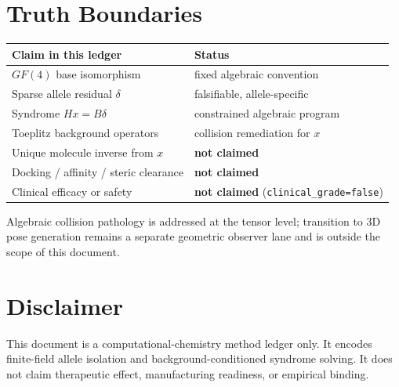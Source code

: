 \documentclass[11pt]{article}
\begin{document}
\section{Truth Boundaries}
\begin{center}
\begin{tabular}{@{}lp{}@{}}
\toprule
Claim in this ledger & Status\\
\midrule
\(GF(4)\) base isomorphism & fixed algebraic convention\\
Sparse allele residual \(\delta\) & falsifiable, allele-specific\\
Syndrome \(Hx=B\delta\) & constrained algebraic program\\
Toeplitz background operators & collision remediation for \(x\)\\
Unique molecule inverse from \(x\) & \textbf{not claimed}\\
Docking / affinity / steric clearance & \textbf{not claimed}\\
Clinical efficacy or safety & \textbf{not claimed}
(\texttt{clinical\_grade=false})\\
\bottomrule
\end{tabular}
\end{center}

Algebraic collision pathology is addressed at the tensor level; transition to
3D pose generation remains a separate geometric observer lane and is outside
the scope of this document.

\section*{Disclaimer}
This document is a computational-chemistry method ledger only. It encodes
finite-field allele isolation and background-conditioned syndrome solving. It
does not claim therapeutic effect, manufacturing readiness, or empirical
binding.
\end{document}
